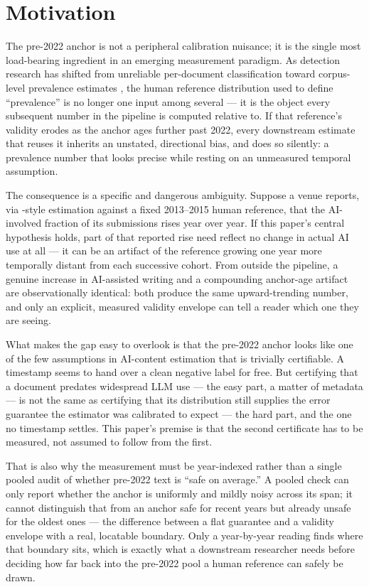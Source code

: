 \documentclass[conference]{IEEEtran}
\begin{document}
\section{Motivation}\label{sec:motivation}

The pre-2022 anchor is not a peripheral calibration nuisance; it is the single most load-bearing ingredient in an emerging measurement paradigm. As detection research has shifted from unreliable per-document classification toward corpus-level prevalence estimates \cite{MonitorAIScale}, the human reference distribution used to define ``prevalence'' is no longer one input among several --- it is the object every subsequent number in the pipeline is computed relative to. If that reference's validity erodes as the anchor ages further past 2022, every downstream estimate that reuses it inherits an unstated, directional bias, and does so silently: a prevalence number that looks precise while resting on an unmeasured temporal assumption.

The consequence is a specific and dangerous ambiguity. Suppose a venue reports, via \cite{MonitorAIScale}-style estimation against a fixed 2013--2015 human reference, that the AI-involved fraction of its submissions rises year over year. If this paper's central hypothesis holds, part of that reported rise need reflect no change in actual AI use at all --- it can be an artifact of the reference growing one year more temporally distant from each successive cohort. From outside the pipeline, a genuine increase in AI-assisted writing and a compounding anchor-age artifact are observationally identical: both produce the same upward-trending number, and only an explicit, measured validity envelope can tell a reader which one they are seeing.

What makes the gap easy to overlook is that the pre-2022 anchor looks like one of the few assumptions in AI-content estimation that is trivially certifiable. A timestamp seems to hand over a clean negative label for free. But certifying that a document predates widespread LLM use --- the easy part, a matter of metadata --- is not the same as certifying that its distribution still supplies the error guarantee the estimator was calibrated to expect --- the hard part, and the one no timestamp settles. This paper's premise is that the second certificate has to be measured, not assumed to follow from the first.

That is also why the measurement must be year-indexed rather than a single pooled audit of whether pre-2022 text is ``safe on average.'' A pooled check can only report whether the anchor is uniformly and mildly noisy across its span; it cannot distinguish that from an anchor safe for recent years but already unsafe for the oldest ones --- the difference between a flat guarantee and a validity envelope with a real, locatable boundary. Only a year-by-year reading finds where that boundary sits, which is exactly what a downstream researcher needs before deciding how far back into the pre-2022 pool a human reference can safely be drawn.
\end{document}
